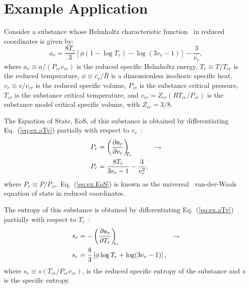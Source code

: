 \section{Example Application}

    Consider         a         substance         whose         Helmholtz          characteristic
    function~\cite{1986-JonesJB+HawkinsGA-Wiley} in reduced coordinates is given by:
    \begin{equation}
        a_r = \frac{8T_r}{3}\left[
                  \phi\left(1 - \log T_r\right) - \log(3v_r - 1)
              \right] - \frac{3}{v_r},
        \label{eq:ex.aTv}
    \end{equation}
    \noindent where $a_r \equiv a / (P_{cr}v_{cr})$ is the reduced specific Helmholtz energy,
    $T_r \equiv T / T_{cr}$ is the reduced temperature, $\phi \equiv \bar{c}_v / \bar{R}$ is a
    dimensionless isochoric specific heat, $v_r \equiv v / v_{cr}$ is the reduced specific
    volume, $P_{cr}$ is the substance critical pressure, $T_{cr}$ is the substance critical
    temperature, and $v_{cr} = Z_{cr}(RT_{cr}/P_{cr})$ is the substance model critical specific
    volume, with $Z_{cr} = 3/8$.

    The  Equation  of  State,  EoS,  of  this   substance   is   obtained   by   differentiating
    Eq.~(\ref{eq:ex.aTv}) partially with respect to $v_r$~\cite{1986-JonesJB+HawkinsGA-Wiley}:
    \begin{align}
        P_r & = \left(\frac{\partial {{a_r}}}{\partial {{v_r}}}\right)_{\!\!\!{T_r}} & \rightharpoondown\\
        P_r & = \frac{8T_r}{3v_r - 1} - \frac{3}{v_r^2}, \label{eq:ex.EoS}
    \end{align}
    \noindent  where  $P_r   \equiv   P/P_{cr}$.   Eq.~(\ref{eq:ex.EoS})   is   known   as   the
    universal~\cite{1899-MaxwellJC-Longmans}              van-der-Waals~\cite{2006-BejanA-Wiley,
    2013-CengelYA+BolesMA-AMGH,  1986-JonesJB+HawkinsGA-Wiley}  equation  of  state  in  reduced
    coordinates.

    The entropy of this substance is obtained by differentiating Eq.~(\ref{eq:ex.aTv}) partially
    with respect to $T_r$~\cite{1986-JonesJB+HawkinsGA-Wiley}:
    \begin{align}
        s_r & = -\left(\frac{\partial {{a_r}}}{\partial {{T_r}}}\right)_{\!\!\!{v_r}} & \rightharpoondown\\
        s_r & = \frac{8}{3}\left[\phi\log T_r + \log(3v_r - 1)\right], \label{eq:ex.sTv}
    \end{align}
    \noindent where $s_r \equiv s(T_{cr} / P_{cr}v_{cr})$, is the reduced  specific  entropy  of
    the substance and $s$ is the specific entropy.


